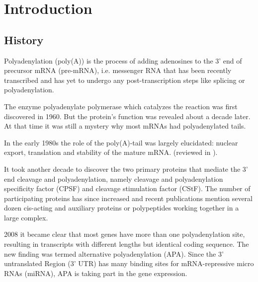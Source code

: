\section{Introduction}

\subsection{History}
Polyadenylation (poly(A)) is the process of adding adenosines to the 3' end of precursor mRNA (pre-mRNA), i.e. messenger RNA that has been recently transcribed and has yet to undergo any post-transcription steps like splicing or polyadenylation.

The enzyme polyadenylate polymerase which catalyzes the reaction was first discovered in 1960. \cite{pmid13819354} But the protein's function was revealed about a decade later. \cite{pmid5288383} At that time it was still a mystery why most mRNAs had polyadenylated tails. 

In the early 1980s the role of the poly(A)-tail was largely elucidated: nuclear export, translation and stability of the mature mRNA. (reviewed in \cite{pmid6111419}). 

It took another decade to discover the two primary proteins that mediate the 3' end cleavage and polyadenylation, namely cleavage and polyadenylation specificity factor (CPSF) and cleavage stimulation factor (CStF). The number of participating proteins has since increased and recent publications mention several dozen cis-acting and auxiliary proteins or polypeptides working together in a large complex. \cite{pmid23774734} 

2008 it became clear that most genes have more than one polyadenylation site, resulting in transcripts with different lengths but identical coding sequence. \cite{pmid18411206} The new finding was termed alternative polyadenylation (APA). Since the 3' untranslated Region (3' UTR) has many binding sites for mRNA-repressive micro RNAs (miRNA), APA is taking part in the gene expression. \cite{pmid18566288}
